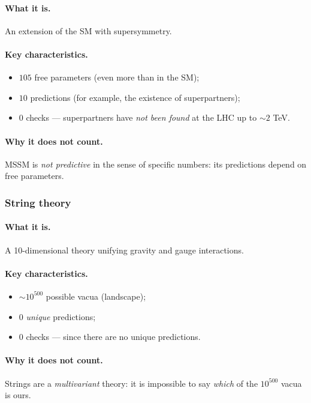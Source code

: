 \documentclass[11pt,a4paper]{article}
\theoremstyle{definition}
\begin{document}
\paragraph{What it is.} 
An extension of the SM with supersymmetry.

\paragraph{Key characteristics.}
\begin{itemize}
    \item $105$ free parameters (even more than in the SM);
    \item $10$ predictions (for example, the existence of 
          superpartners);
    \item $0$ checks — superpartners have \emph{not been found} 
          at the LHC up to $\sim 2$ TeV.
\end{itemize}

\paragraph{Why it does not count.}
MSSM is \emph{not predictive} in the sense of specific numbers: 
its predictions depend on free parameters.

\subsubsection{String theory}

\paragraph{What it is.} 
A 10-dimensional theory unifying gravity and gauge 
interactions.

\paragraph{Key characteristics.}
\begin{itemize}
    \item $\sim 10^{500}$ possible vacua (landscape);
    \item $0$ \emph{unique} predictions;
    \item $0$ checks — since there are no unique predictions.
\end{itemize}

\paragraph{Why it does not count.}
Strings are a \emph{multivariant} theory: it is impossible to say 
\emph{which} of the $10^{500}$ vacua is ours.
\end{document}
